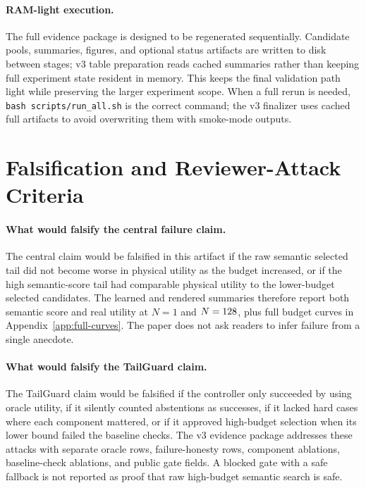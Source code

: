 \documentclass{article}
\begin{document}
\paragraph{RAM-light execution.}
The full evidence package is designed to be regenerated sequentially. Candidate pools, summaries, figures, and optional status artifacts are written to disk between stages; v3 table preparation reads cached summaries rather than keeping full experiment state resident in memory. This keeps the final validation path light while preserving the larger experiment scope. When a full rerun is needed, \texttt{bash scripts/run\_all.sh} is the correct command; the v3 finalizer uses cached full artifacts to avoid overwriting them with smoke-mode outputs.

\section{Falsification and Reviewer-Attack Criteria}
\label{app:falsification}

\paragraph{What would falsify the central failure claim.}
The central claim would be falsified in this artifact if the raw semantic selected tail did not become worse in physical utility as the budget increased, or if the high semantic-score tail had comparable physical utility to the lower-budget selected candidates. The learned and rendered summaries therefore report both semantic score and real utility at $N=1$ and $N=128{}$, plus full budget curves in Appendix~\ref{app:full-curves}. The paper does not ask readers to infer failure from a single anecdote.

\paragraph{What would falsify the TailGuard claim.}
The TailGuard claim would be falsified if the controller only succeeded by using oracle utility, if it silently counted abstentions as successes, if it lacked hard cases where each component mattered, or if it approved high-budget selection when its lower bound failed the baseline checks. The v3 evidence package addresses these attacks with separate oracle rows, failure-honesty rows, component ablations, baseline-check ablations, and public gate fields. A blocked gate with a safe fallback is not reported as proof that raw high-budget semantic search is safe.
\end{document}
